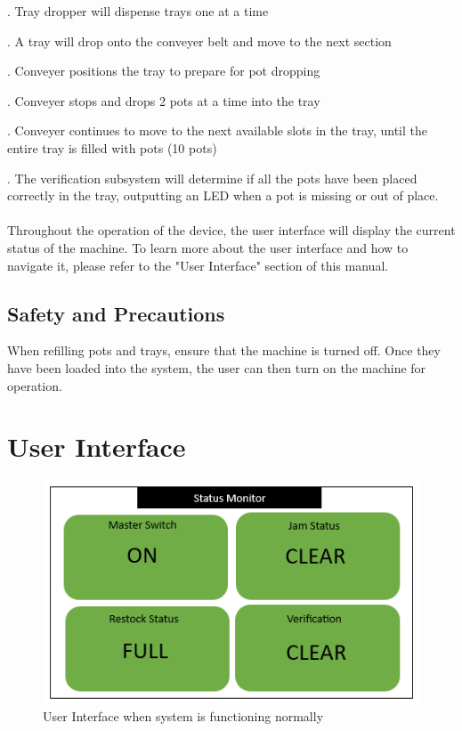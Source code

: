 \documentclass[12pt, titlepage]{article}
\begin{document}
 .	Tray dropper will dispense trays one at a time

 .	A tray will drop onto the conveyer belt and move to the next section

 .	Conveyer positions the tray to prepare for pot dropping

 .	Conveyer stops and drops 2 pots at a time into the tray

 .	Conveyer continues to move to the next available slots in the tray, until the entire tray is filled with pots (10 pots)

 .	The verification subsystem will determine if all the pots have been placed correctly in the tray, outputting an LED when a pot is missing or out of place. 
\\
\\ \noindent Throughout the operation of the device, the user interface will display the current status of the machine. To learn more about the user interface and how to navigate it, please refer to the "User Interface" section of this manual.
\subsection{Safety and Precautions}
When refilling pots and trays, ensure that the machine is turned off. Once they have been loaded into the system, the user can then turn on the machine for operation.
\section{User Interface}
\begin{figure}[H]
    \centering
    \includegraphics{statusgood.png}
    \caption{User Interface when system is functioning normally}
    \label{fig:scope}
  \end{figure}
\end{document}
